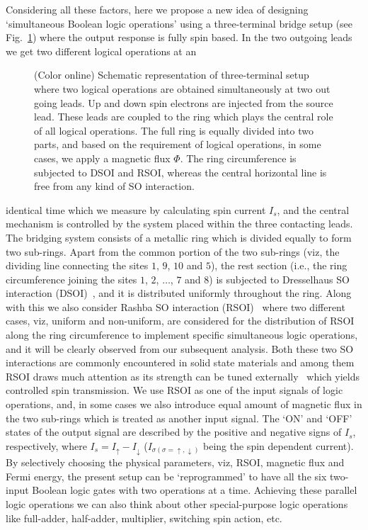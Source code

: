\documentclass[doublecol]{epl2}
\begin{document}
Considering all these factors, here we propose a new idea of designing 
`simultaneous Boolean logic operations' using a three-terminal bridge
setup (see Fig.~\ref{fig1}) where the output response is fully spin based. 
In the two outgoing leads we get two different logical operations at an
\begin{figure}[ht]
{\centering {}\par}
\caption{(Color online) Schematic representation of three-terminal setup 
where two logical operations are obtained simultaneously at two out going 
leads. Up and down spin electrons are injected from the source lead. These 
leads are coupled to the ring which plays the central role of all logical 
operations. The full ring is equally divided into two parts, and based on 
the requirement of logical operations, in some cases, we apply a magnetic 
flux $\Phi$. The ring circumference is subjected to DSOI and RSOI, whereas 
the central horizontal line is free from any kind of SO interaction.}
\label{fig1}
\end{figure}
identical time which we measure by calculating spin current $I_s$, and
the central mechanism is controlled by the system placed within the three
contacting leads. The bridging system consists of a metallic ring which is
divided equally to form two sub-rings. Apart from the common portion of the 
two sub-rings (viz, the dividing line connecting the sites $1$, $9$, $10$ 
and $5$), the rest section (i.e., the ring circumference joining the sites 
$1$, $2$, $\dots$, $7$ and $8$) is subjected to Dresselhaus SO 
interaction (DSOI)~\cite{dsoi}, and it is distributed uniformly throughout 
the ring. Along with this we also consider Rashba SO interaction 
(RSOI)~\cite{rsoi} where two different cases, viz, uniform and non-uniform, 
are considered for the distribution of RSOI along the ring circumference to
implement specific simultaneous logic operations, and it will be clearly 
observed from our subsequent analysis. Both these two SO interactions are 
commonly encountered in solid state materials and 
among them RSOI draws much attention as its strength can be tuned 
externally~\cite{gate1,gate2} which yields controlled spin transmission. 
We use RSOI as one of the input signals of logic operations, and, in some 
cases we also introduce equal amount of magnetic flux in the two sub-rings
which is treated as another input signal. The `ON' and `OFF' states of the 
output signal are described by the positive and negative signs of $I_s$, 
respectively, where $I_s=I_{\uparrow}-I_{\downarrow}$ 
($I_{\sigma (\sigma=\uparrow,\downarrow)}$ being the spin dependent current). 
By selectively choosing the physical parameters, viz, RSOI, magnetic flux and
Fermi energy, the present setup can be `reprogrammed' to have all the six 
two-input Boolean logic gates with two operations at a time. Achieving these 
parallel logic operations we can also think about other special-purpose logic 
operations~\cite{repro} like full-adder, half-adder, multiplier, switching 
spin action, etc.
\end{document}
